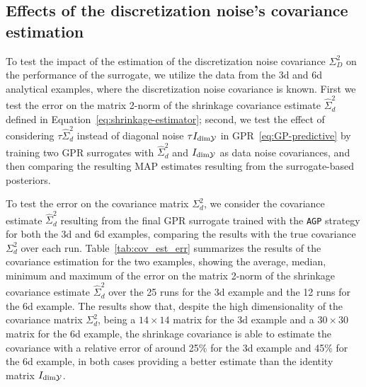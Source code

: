 \subsection[Effects of covariance estimation]{Effects of the discretization noise's covariance estimation}\label{sec:cov-est}

To test the impact of the estimation of the discretization noise covariance $\Sigma_D^2$ on the performance of the surrogate, we utilize the data from the 3d and 6d analytical examples, where the discretization noise covariance is known.
First we test the error on the matrix 2-norm of the shrinkage covariance estimate $\hat \Sigma_d^2$ defined in Equation~\eqref{eq:shrinkage-estimator}; second, we test the effect of considering $\tau \hat \Sigma_d^2$ instead of diagonal noise $\tau I_{\text{dim}\mathcal Y}$ in GPR~\eqref{eq:GP-predictive} by training two GPR surrogates with $\hat \Sigma_d^2$ and $I_{\text{dim} \mathcal Y}$ as data noise covariances, and then comparing the resulting MAP estimates resulting from the surrogate-based posteriors.\medskip


To test the error on the covariance matrix $\Sigma_d^2$, we consider the covariance estimate $\hat \Sigma_d^2$ resulting from the final GPR surrogate trained with the \texttt{AGP} strategy for both the 3d and 6d examples, comparing the results with the true covariance $\Sigma_d^2$ over each run.
Table~\ref{tab:cov_est_err} summarizes the results of the covariance estimation for the two examples, showing the average, median, minimum and maximum of the error on the matrix 2-norm of the shrinkage covariance estimate $\hat \Sigma_d^2$ over the 25 runs for the 3d example and the 12 runs for the 6d example. \newline
The results show that, despite the high dimensionality of the covariance matrix $\Sigma_d^2$, being a $14\times 14$ matrix for the 3d example and a $30 \times 30$ matrix for the 6d example, the shrinkage covariance is able to estimate the covariance with a relative error of around 25\% for the 3d example and 45\% for the 6d example, in both cases providing a better estimate than the identity matrix $I_{\text{dim} \mathcal Y}$. \medskip

